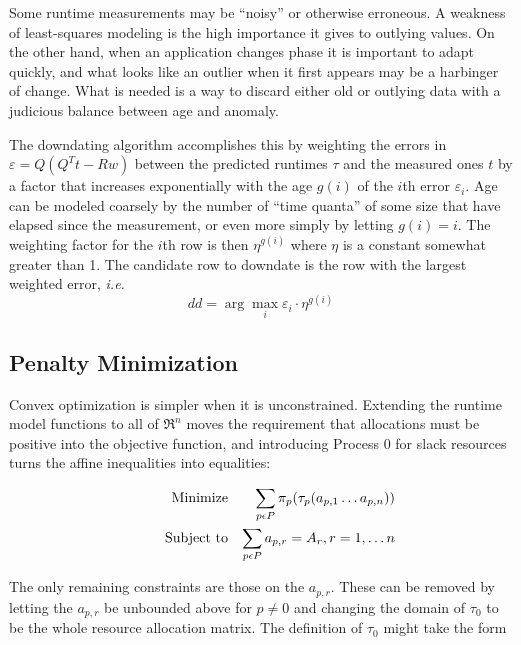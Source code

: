 Some runtime measurements may be ``noisy'' or otherwise erroneous.
A weakness of least-squares modeling is the high importance it gives to outlying values.
On the other hand, when an application changes phase it is important to adapt quickly,
and what looks like an outlier when it first appears may be a harbinger of change.
What is needed is a way to discard either old or outlying data
with a judicious balance between age and anomaly.

The downdating algorithm accomplishes this by weighting the errors in $\varepsilon = Q(Q^Tt - Rw)$
between the predicted runtimes $\tau$ and the measured ones $t$ by a factor
that increases exponentially with the age $g(i)$ of the $i$th error $\varepsilon_i$.
Age can be modeled coarsely by the number of ``time quanta'' of some size
that have elapsed since the measurement, or even more simply by letting $g(i) = i$.
The weighting factor for the $i$th row is then $\eta^{g(i)}$ where $\eta$ is a constant somewhat greater than 1.
The candidate row to downdate is the row with the largest weighted error, \emph{i.e.}
\begin{displaymath}
dd = \arg\max_i \varepsilon_i \cdot \eta^{g(i)}
\end{displaymath}

\subsection*{Penalty Minimization}

Convex optimization is simpler when it is unconstrained.
Extending the runtime model functions to all of $\Re^n$
moves the requirement that allocations must be positive into the objective function,
and introducing Process 0 for slack resources turns the affine inequalities into equalities:

\begin{eqnarray*}
& \makebox[1in][r]{Minimize}   & \sum_{p\epsilon P} {\pi_p(\tau_p(a_{p,1}\ldots a_{p,n}))}  \\
& \makebox[1in][r]{Subject to} & \sum_{p\epsilon P} a_{p,r} = A_r, r = 1,\ldots n           \\
\end{eqnarray*}

The only remaining constraints are those on the $a_{p,r}$.
These can be removed by letting the $a_{p,r}$ be unbounded above for $p \neq 0$
and changing the domain of $\tau_0$  to be the whole resource allocation matrix.
The definition of $\tau_0$ might take the form

